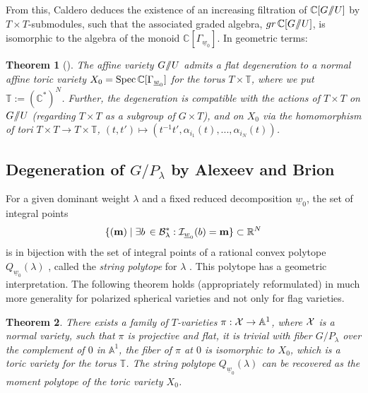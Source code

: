 \documentclass{emsprocart}
\newtheorem{theorem}{Theorem}[section]
\theoremstyle{definition}
\begin{document}
From this, Caldero deduces the existence of an increasing filtration of $\mathbb C[G/\hskip -3.5pt/U]$
by $T\times T$-submodules, such that the associated graded algebra, $gr\,\mathbb C[G/\hskip -3.5pt/U]$,
is isomorphic to the algebra of the monoid $\mathbb C[{\Gamma}_{{\underline{w}_0}}]$.
In geometric terms:
\begin{theorem}[\rm \cite{Ca1}]
The affine variety $G/\hskip -3.5pt/U$ admits a flat degeneration
to a normal affine toric variety $X_0={\rm Spec\,}\mathbb C[{\Gamma}_{{\underline{w}_0}}]$ for the torus $T\times \mathbb T$,
where we put $\mathbb T := (\mathbb C^*)^N$.
Further, the degeneration is compatible with the actions of $T\times T$ on $G/\hskip -3.5pt/U$
(regarding $T\times T$ as a subgroup of $G\times T$), and on $X_0$ via the homomorphism
of tori $T\times T\rightarrow T\times\mathbb  T$, $(t, t')\mapsto (t^{-1}t', \alpha_{i_1} (t), . . . , \alpha_{i_N} (t))$.
\end{theorem}

\subsection{Degeneration of \texorpdfstring{${G/P_\lambda}$}{the flag variety} by Alexeev and Brion}\label{ALBriondeg}
For a given dominant weight $\lambda$ and a fixed reduced decomposition $\underline{w}_0$,
the set of integral points
$$
\{{(\mathbf m})\mid \exists b\,\in {\cal B}^*_\lambda: {\cal I}_{\underline{w}_0}(b)=\mathbf m\}\subset \mathbb R^N
$$
is in bijection with the set of integral points of a rational convex polytope $Q_{\underline{w}_0}(\lambda)$ ,
called the {\it string polytope} for $\lambda$ \cite{BZ,L3}. This polytope has a geometric interpretation. The following
theorem holds (appropriately reformulated) in much more generality for polarized spherical varieties and not only
for flag varieties.
\begin{theorem}{\rm \cite{AB}}
There exists a family of $T$-varieties $\pi: {\cal X} \rightarrow \mathbb A^1$, where ${\cal X}$ is a
normal variety, such that $\pi$ is projective and flat, it is trivial with fiber $G/P_\lambda$ over the complement of $0$ in $\mathbb A^1$,
the fiber of $\pi$ at $0$ is isomorphic to $X_0$, which is a toric variety for the torus $\mathbb T$. The string polytope
$Q_{\underline{w}_0}(\lambda)$ can be recovered as the moment polytope of the
toric variety $X_0$.
\end{theorem}
\end{document}
